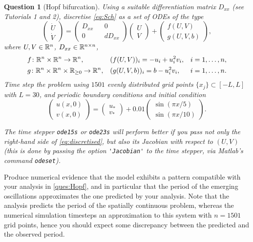 \documentclass[a4paper]{siamart220329}
\theoremstyle{plain}
\newtheorem{question}{Question}
\begin{document}
\begin{question}[Hopf bifurcation]
  Using a suitable differentiation matrix $D_{xx}$ (see Tutorials 1 and 2),
  discretise \cref{eq:Sch} as a set of ODEs of the type
  \[
  \begin{pmatrix} \dot U \\ \dot V \end{pmatrix} 
  = 
  \begin{pmatrix} D_{x x} && 0 \\ 0 && d D_{xx}\end{pmatrix} 
  \begin{pmatrix}  U \\  V \end{pmatrix}  + 
  \begin{pmatrix}  f(U,V) \\  g(U,V,b) \end{pmatrix},\] 
where $U, V \in \mathbb{R}^n$, $D_{xx} \in \mathbb{R}^{n \times n}$, 
\begin{equation}\label{eq:discretised}
  \begin{aligned}
  & f \colon \RSet^n \times \RSet^n \to \RSet^n, 
    && ( f(U,V) )_i = -u_i + u_i^2 v_i, && i = 1,\ldots,n, \\
  & g \colon \RSet^n \times \RSet^n \times \RSet_{\geq 0} \to \RSet^n, 
    && ( g(U,V,b))_i = b- u_i^2 v_i, && i = 1,\ldots,n.
  \end{aligned}
\end{equation}
%
Time step the problem using $1501$ evenly distributed grid points $\{ x_j \} \subset
[-L,L]$ with $L=30$, and periodic boundary conditions and initial condition
\[
  \begin{pmatrix} u(x,0) \\ v(x,0) \end{pmatrix} = 
  \begin{pmatrix} u_* \\ v_* \end{pmatrix} +
  0.01
  \begin{pmatrix} \sin(\pi x/5) \\ \sin(\pi x/10) \end{pmatrix}.
\]

The time stepper \lstinline|ode15s| or \lstinline|ode23s| will perform better if you
pass not only the right-hand side
of \cref{eq:discretised}, but also its Jacobian with respect to $(U,V)$ (this is done
by passing the option \lstinline|'Jacobian'| to the time stepper, via Matlab's command \lstinline|odeset|).
\end{question}

Produce numerical evidence that the model exhibits a pattern compatible with your
analysis in \cref{ques:Hopf}, and in particular that the period of the emerging
oscillations approximates the one predicted by your analysis. Note that the analysis
predicts the period of the spatially continuous problem, whereas the numerical
simulation timesteps an approximation to this system with $n=1501$ grid points, hence
you should expect some discrepancy between the predicted and the observed period.
\end{document}
